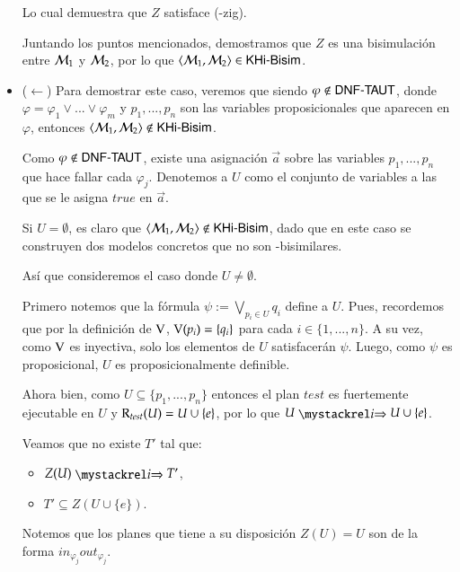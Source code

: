 \begin{demostracion}
\begin{itemize}
    Lo cual demuestra que $Z$ satisface (\KHilogic-zig). 

    Juntando los puntos mencionados, demostramos que $Z$ es una bisimulación entre $\mathcal{M}_1$ y $\mathcal{M}_2$, 
    por lo que $\langle \mathcal{M}_1,\mathcal{M}_2 \rangle \in \rm\textsf{KHi-Bisim}$. 

    \item ($\leftarrow$) Para demostrar este caso, veremos que siendo $\varphi \notin \rm\textsf{DNF-TAUT}$, 
    donde $\varphi = \varphi_1 \vee ... \vee \varphi_m$ y $p_1,...,p_n$ son las variables proposicionales que aparecen en $\varphi$, 
    entonces $\langle \mathcal{M}_1,\mathcal{M}_2 \rangle \notin \rm\textsf{KHi-Bisim}$.

    Como $\varphi \notin \rm\textsf{DNF-TAUT}$, existe una asignación $\overrightarrow{a}$ sobre las variables $p_1,...,p_n$ que hace fallar 
    cada $\varphi_j$. Denotemos a $U$ como el conjunto de variables a las que se le asigna $true$ en $\overrightarrow{a}$.

    Si $U = \emptyset$, es claro que $\langle \mathcal{M}_1,\mathcal{M}_2 \rangle \notin \rm\textsf{KHi-Bisim}$, dado que en este caso se construyen 
    dos modelos concretos que no son \KHilogic-bisimilares.

    Así que consideremos el caso donde $U \neq \emptyset$.
    
    Primero notemos que la fórmula $\psi := \bigvee\limits_{p_i \in U} q_i$ define a $U$. 
    Pues, recordemos que por la definición de $\mathrm{V}$, $\mathrm{V}(p_i) = \{q_i\}$ para cada $i \in \{1,...,n\}$. 
    A su vez, como $\mathrm{V}$ es inyectiva, solo los elementos de $U$ satisfacerán $\psi$. Luego, como $\psi$ es proposicional, 
    $U$ es proposicionalmente definible.

    Ahora bien, como $U \subseteq \{p_1,...,p_n\}$ entonces el plan $test$ es fuertemente ejecutable en $U$ y 
    $\mathrm{R}_{test}(U) = U \cup \{e\}$, por lo que $U \ultsExecAgi U \cup \{e\}$.
    
    Veamos que no existe $T'$ tal que:

    \begin{multicols}{2}
        \begin{itemize}
            \item $Z(U) \ultsExecAgi T'$, 
            \item $T' \subseteq Z(U \cup \{e\})$.
        \end{itemize}
    \end{multicols}

    Notemos que los planes que tiene a su disposición $Z(U) = U$ son de la forma $in_{\varphi_j}out_{\varphi_j}$.


\end{itemize}
\end{demostracion}
